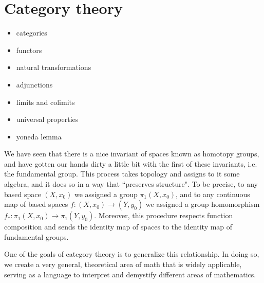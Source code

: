 \documentclass[10pt]{amsart}
\theoremstyle{definition}
\begin{document}
\section{Category theory}
\begin{itemize}
    \item categories
    \item functors
    \item natural transformations
    \item adjunctions
    \item limits and colimits
    \item universal properties
    \item yoneda lemma
\end{itemize}

We have seen that there is a nice invariant of spaces known as homotopy groups, and have gotten our hands dirty a little bit with the first of these invariants, i.e. the fundamental group. This process takes topology and assigns to it some algebra, and it does so in a way that ``preserves structure". To be precise, to any based space $(X, x_0)$ we assigned a group $\pi_1(X, x_0)$, and to any continuous map of based spaces $f:(X, x_0) \to (Y, y_0)$ we assigned a group homomorphism $f_*:\pi_1(X, x_0) \to \pi_1(Y, y_0)$. Moreover, this procedure respects function composition and sends the identity map of spaces to the identity map of fundamental groups. 

One of the goals of category theory is to generalize this relationship. In doing so, we create a very general, theoretical area of math that is widely applicable, serving as a language to interpret and demystify different areas of mathematics.
\end{document}
